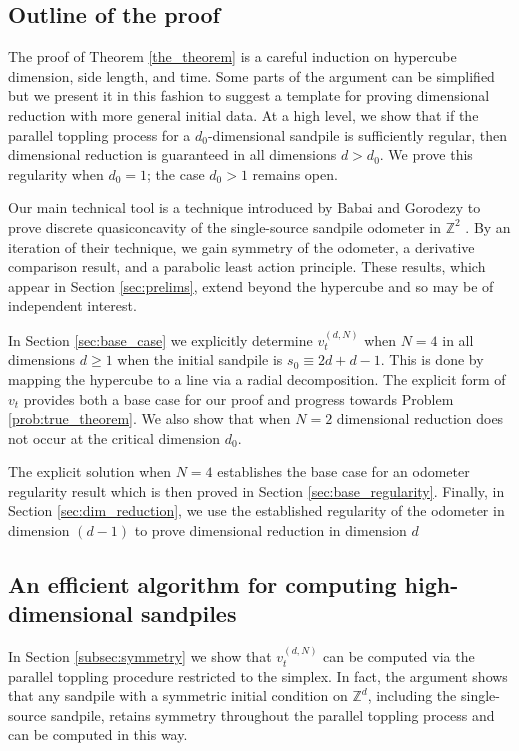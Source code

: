 \documentclass[12pt]{amsart}
\newcommand{\Z}{\mathbb{Z}}
\begin{document}
	
	
	
	
	\subsection{Outline of the proof} \label{subsec:outline}
	The proof of Theorem \ref{the_theorem} is a careful induction on hypercube dimension, side length, and time. Some parts of the argument can be simplified 
	but we present it in this fashion to suggest a template for proving dimensional reduction with more general initial data. At a high level, 
	we show that if the parallel toppling process for a $d_0$-dimensional sandpile is sufficiently regular, then dimensional reduction is guaranteed 
	in all dimensions $d > d_0$. We prove this regularity when $d_0=1$; the case $d_0 > 1$ remains open. 
	
	
	Our main technical tool is a technique introduced by Babai and Gorodezy to prove discrete quasiconcavity of the single-source sandpile odometer in $\Z^2$ \cite{babai2007sandpile}. By an iteration of their technique, we gain symmetry of the odometer, a derivative comparison result, and a parabolic least action principle. These results, which appear in Section \ref{sec:prelims}, extend beyond the hypercube and so may be of independent interest. 
	
	
	In Section \ref{sec:base_case} we explicitly determine $v_t^{(d,N)}$ when $N=4$ in all dimensions $d \geq 1$ when the initial sandpile is $s_0 \equiv 2 d + d-1$. This is done by 
	mapping the hypercube to a line via a radial decomposition. The explicit form of $v_t$ provides both a base case for our proof and progress towards Problem \ref{prob:true_theorem}.	We also show that when $N=2$ dimensional reduction does not occur at the critical dimension $d_0$. 
	
	The explicit solution when $N=4$ establishes the base case for an odometer regularity result which is then proved in Section \ref{sec:base_regularity}. Finally, in Section \ref{sec:dim_reduction}, we use the established regularity of the odometer in dimension $(d-1)$ to prove dimensional reduction in dimension $d$ 
	
		\subsection*{An efficient algorithm for computing high-dimensional sandpiles}
	In Section \ref{subsec:symmetry} we show that $v_t^{(d,N)}$ can be computed via the parallel toppling procedure restricted to the simplex. In fact, the argument shows that any sandpile with a symmetric initial condition on $\Z^d$, including the single-source sandpile, retains symmetry throughout the parallel toppling process and can be computed in this way. 
	
\end{document}
